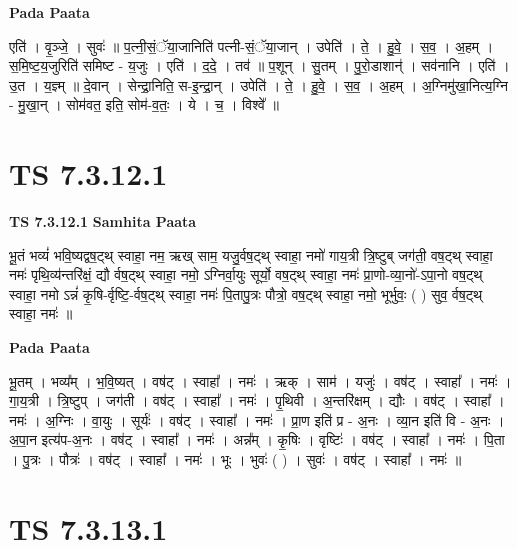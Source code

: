 \documentclass[17pt]{extarticle}
\begin{document}
\textbf{Pada Paata} \newline

एति॑ । वृ॒ञ्जे॒ । सुवः॑ ॥ प॒त्नी॒सं॒ॅया॒जानिति॑ पत्नी-सं॒ॅया॒जान् । उपेति॑ । ते॒ । हु॒वे॒ । स॒व॒ । अ॒हम् । स॒मि॒ष्ट॒य॒जुरिति॑ समिष्ट - य॒जुः । एति॑ । द॒दे॒ । तव॑ ॥ प॒शून् । सु॒तम् । पु॒रो॒डाशान्॑ । सव॑नानि । एति॑ । उ॒त । य॒ज्ञ्म् ॥ दे॒वान् । सेन्द्रा॒निति॒ स-इ॒न्द्रा॒न् । उपेति॑ । ते॒ । हु॒वे॒ । स॒व॒ । अ॒हम् । अ॒ग्निमु॑खा॒नित्य॒ग्नि - मु॒खा॒न् । सोम॑वत॒ इति॒ सोम॑-व॒तः॒ । ये । च॒ । विश्वे᳚ ॥  \newline




\section*{ TS 7.3.12.1 }

\textbf{TS 7.3.12.1 } \newline
\textbf{Samhita Paata} \newline

भू॒तं भव्यं॑ भवि॒ष्यद्वष॒ट्थ् स्वाहा॒ नम॒ ऋख् साम॒ यजु॒र्वष॒ट्थ् स्वाहा॒ नमो॑ गाय॒त्री त्रि॒ष्टुब् जग॑ती॒ वष॒ट्थ् स्वाहा॒ नमः॑ पृथि॒व्य॑न्तरि॑क्षं॒ द्यौ र्वष॒ट्थ् स्वाहा॒ नमो॒ ऽग्निर्वा॒युः सूर्यो॒ वष॒ट्थ् स्वाहा॒ नमः॑ प्रा॒णो-व्या॒नो॑-ऽपा॒नो वष॒ट्थ् स्वाहा॒ नमो ऽन्नं॑ कृ॒षि-र्वृष्टि॒-र्वष॒ट्थ् स्वाहा॒ नमः॑ पि॒तापु॒त्रः पौत्रो॒ वष॒ट्थ् स्वाहा॒ नमो॒ भूर्भुवः॒ ( ) सुव॒ र्वष॒ट्थ् स्वाहा॒ नमः॑ ॥ \newline

\textbf{Pada Paata} \newline

भू॒तम् । भव्य᳚म् । भ॒वि॒ष्यत् । वष॑ट् । स्वाहा᳚ । नमः॑ । ऋक् । साम॑ । यजुः॑ । वष॑ट् । स्वाहा᳚ । नमः॑ । गा॒य॒त्री । त्रि॒ष्टुप् । जग॑ती । वष॑ट् । स्वाहा᳚ । नमः॑ । पृ॒थिवी । अ॒न्तरि॑क्षम् । द्यौः । वष॑ट् । स्वाहा᳚ । नमः॑ । अ॒ग्निः । वा॒युः । सूर्यः॑ । वष॑ट् । स्वाहा᳚ । नमः॑ । प्रा॒ण इति॑ प्र - अ॒नः । व्या॒न इति॑ वि - अ॒नः । अ॒पा॒न इत्य॑प-अ॒नः । वष॑ट् । स्वाहा᳚ । नमः॑ । अन्न᳚म् । कृ॒षिः । वृष्टिः॑ । वष॑ट् । स्वाहा᳚ । नमः॑ । पि॒ता । पु॒त्रः । पौत्रः॑ । वष॑ट् । स्वाहा᳚ । नमः॑ । भूः । भुवः॑ ( ) । सुवः॑ । वष॑ट् । स्वाहा᳚ । नमः॑ ॥  \newline




\section*{ TS 7.3.13.1 }
\end{document}
